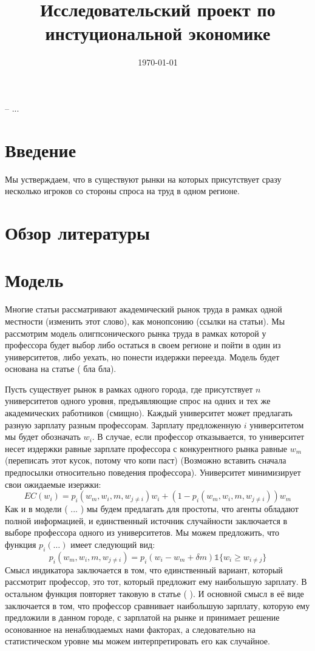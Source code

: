 \documentclass[a4paper, 12pt]{article}
\title{Исследовательский проект по инстуциональной экономике}
\date{\today}
\theoremstyle{definition}
\theoremstyle{plain}
\begin{document}
\maketitle

-- ...

\section{Введение}
Мы устверждаем, что в существуют рынки на которых присутствует сразу несколько игроков со стороны спроса на труд в одном регионе. 
\section{Обзор литературы}

\section{Модель}

Многие статьи рассматривают академический рынок труда в рамках одной местности (изменить этот слово), как монопсонию (ссылки на статьи). Мы рассмотрим модель олигпсонического рынка труда в рамках которой у профессора будет выбор либо остаться в своем регионе и пойти в один из университетов, либо уехать, но понести издержки переезда. Модель будет основана на статье ( бла бла). 

Пусть существует рынок в рамках одного города, где присутствует $n$ университетов одного уровня, предъявляющие спрос на одних и тех же академических работников (смищно). Каждый университет может предлагать разную зарплату разным профессорам. Зарплату предложенную $i$ университетом мы будет обозначать $w_i$. В случае, если профессор отказывается, то университет несет издержки равные зарплате профессора с конкурентного рынка равные $w_m$ (переписать этот кусок, потому что копи паст) (Возможно вставить сначала предпосылки относительно поведения профессора). Университет минимизирует свои ожидаемые изержки: 
\[
EC(w_i) = p_i(w_m, w_i, m, w_{j \neq i})w_i + (1 - p_i(w_m, w_i, m, w_{j \neq i}))w_m
\]
Как и в модели ( ... ) мы будем предлагать для простоты, что агенты обладают полной информацией, и единственный источник случайности заключается в выборе профессора одного из университетов. Мы можем предложить, что функция $p_i (\ldots) $ имеет следующий вид: 
\[
p_i( w_m, w_i, m, w_{j \neq i}) = p_i(w_i - w_m + \delta m) \mathds{1} \{ w_i \geq w_ {i \neq j}\}
\]
Смысл индикатора заключается в том, что единственный вариант, который рассмотрит профессор, это тот, который предложит ему наибольшую зарплату. В остальном функция повторяет таковую в статье ( ).  И основной смысл в её виде заключается в том, что профессор сравнивает наибольшую зарплату, которую ему предложили в данном городе, с зарплатой на рынке и принимает решение осонованное на ненаблюдаемых нами факторах, а следовательно на статистическом уровне мы можем интерпретировать его как случайное. 
\end{document}
